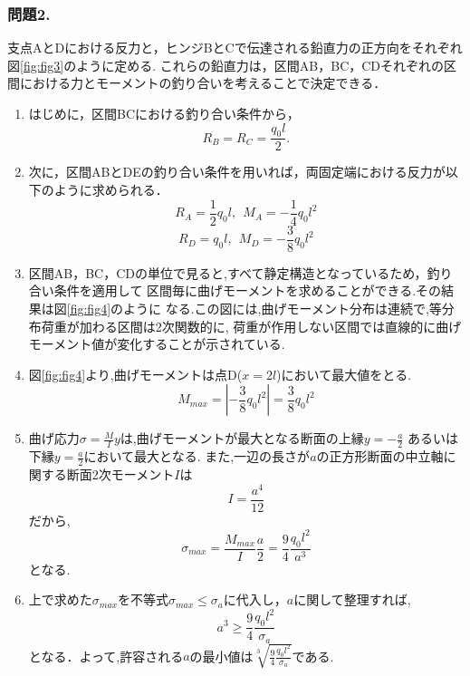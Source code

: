 ﻿\documentclass[10pt,a4j]{jarticle}
\begin{document}
\subsubsection*{問題2.}
支点AとDにおける反力と，ヒンジBとCで伝達される鉛直力の正方向をそれぞれ図\ref{fig:fig3}のように定める.
これらの鉛直力は，区間AB，BC，CDそれぞれの区間における力とモーメントの釣り合いを考えることで決定できる．
\begin{enumerate}
\item
はじめに，区間BCにおける釣り合い条件から，
\begin{equation}
	R_B=R_C=\frac{q_0l}{2}.
\end{equation}
\item
次に，区間ABとDEの釣り合い条件を用いれば，両固定端における反力が以下のように求められる．
\begin{equation}
	R_A=\frac{1}{2}q_0l, \ \ M_A=-\frac{1}{4}q_0l^2  
\end{equation}
\begin{equation}
	R_D=q_0l, \ \ M_D=-\frac{3}{8}q_0l^2
\end{equation}
\item
区間AB，BC，CDの単位で見ると,すべて静定構造となっているため，釣り合い条件を適用して
区間毎に曲げモーメントを求めることができる.その結果は図\ref{fig:fig4}のように
なる.この図には,曲げモーメント分布は連続で,等分布荷重が加わる区間は2次関数的に,
荷重が作用しない区間では直線的に曲げモーメント値が変化することが示されている.
\item
図\ref{fig:fig4}より,曲げモーメントは点D($x=2l$)において最大値をとる.
\begin{equation}
	M_{max}=\left|-\frac{3}{8}q_0l^2\right| = \frac{3}{8}q_0l^2
\end{equation}
\item
	曲げ応力$\sigma=\frac{M}{I}y$は,曲げモーメントが最大となる断面の上縁$y=-\frac{a}{2}$
	あるいは下縁$y=\frac{a}{2}$において最大となる.
	また,一辺の長さが$a$の正方形断面の中立軸に関する断面2次モーメント$I$は
\begin{equation}
	I=\frac{a^4}{12}	
\end{equation}
だから,
\begin{equation}
	\sigma_{max}=
	\frac{M_{max}}{I}\frac{a}{2}=
	\frac{9}{4} \frac{q_0l^2}{a^3}
\end{equation}
となる.
\item
	上で求めた$\sigma_{max}$を不等式$\sigma_{max}\leq \sigma_a$に代入し，$a$に関して整理すれば,
\begin{equation}
	a^3 \geq \frac{9}{4}\frac{q_0l^2}{\sigma_a} 
\end{equation}
		となる．よって,許容される$a$の最小値は$\sqrt[3]{\frac{9}{4}\frac{q_0l^2}{\sigma_a}}$である.
\end{enumerate}
\end{document}
